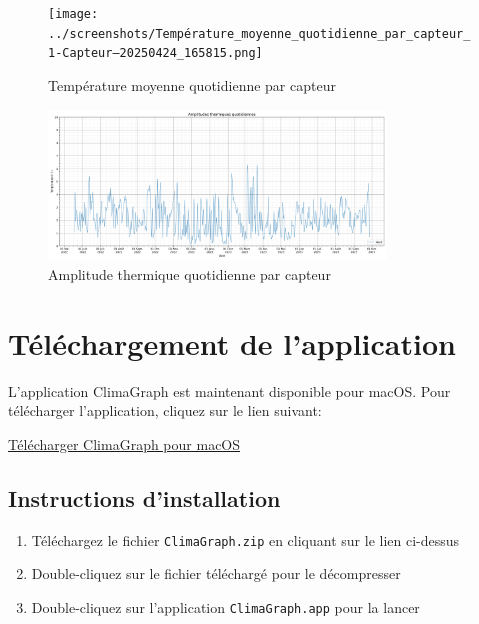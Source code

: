 \documentclass[a4paper,11pt]{article}
\begin{document}
\newpage

\begin{figure}[h]
    \centering
    \texttt{[image: ../screenshots/Température\_moyenne\_quotidienne\_par\_capteur\_1-Capteur---20250424\_165815.png]}
    \caption{Température moyenne quotidienne par capteur}
\end{figure}

\begin{figure}[h]
    \centering
    \includegraphics[width=0.8\textwidth]{../screenshots/Amplitude_thermique_quotidienne_1-Capteur---20250427_112247.png}
    \caption{Amplitude thermique quotidienne par capteur}
\end{figure}


\newpage
\section{Téléchargement de l'application}

L'application ClimaGraph est maintenant disponible pour macOS. Pour télécharger l'application, cliquez sur le lien suivant:

\begin{center}
\colorbox{gray!20}{
\begin{minipage}{0.8\textwidth}
\vspace{0.3cm}
\centering
\Large{\href{https://github.com/stephene369/TemperatureGraphMacProgramm/raw/main/ClimaGraph.zip}{Télécharger ClimaGraph pour macOS}}
\vspace{0.3cm}
\end{minipage}
}
\end{center}

\subsection{Instructions d'installation}
\begin{enumerate}
    \item Téléchargez le fichier \texttt{ClimaGraph.zip} en cliquant sur le lien ci-dessus
    \item Double-cliquez sur le fichier téléchargé pour le décompresser
    \item Double-cliquez sur l'application \texttt{ClimaGraph.app} pour la lancer
\end{enumerate}
\end{document}
